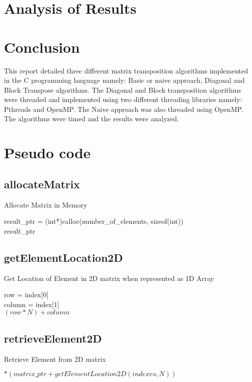 \documentclass[10pt,onecolumn]{article}
\begin{document}
\section{Analysis of Results}
%
%
\section{Conclusion}
%
This report detailed three different matrix transposition algorithms implemented in the C programming language namely: Basic or naive approach, Diagonal and Block Transpose algorithms. The Diagonal and Block transposition algorithms were threaded and implemented using two different threading libraries namely: Pthreads and OpenMP. The Naive approach was also threaded using OpenMP. The algorithms were timed and the results were analyzed.
%
\clearpage
\appendix
\label{App:Apendix}
\section{Pseudo code}
\subsection{allocateMatrix}
    \begin{algorithm}[H]
        \caption{Allocate Matrix in Memory}
        result\_ptr = (int*)calloc(number\_of\_elements, sizeof(int)) \\
        \Return result\_ptr
    \end{algorithm}
%
\subsection{getElementLocation2D}
    \begin{algorithm}[H]
        \caption{Get Location of Element in 2D matrix when represented as 1D Array}
        row = index[0]\\
        column = index[1]\\
        \Return $(row*N)+column$
    \end{algorithm}
\subsection{retrieveElement2D}
    \begin{algorithm}[H]
        \caption{Retrieve Element from 2D matrix}
        \Return $*(matrix\_ptr + getElementLocation2D(indexes, N))$
    \end{algorithm}
%
\end{document}
